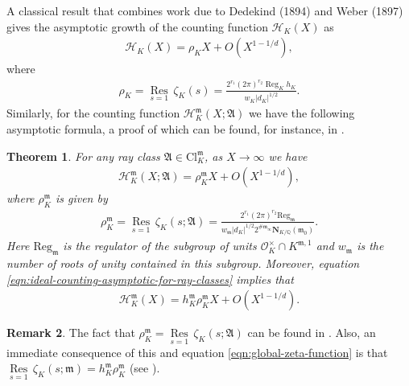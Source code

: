 \documentclass[11pt, reqno]{amsart}
\numberwithin{equation}{section}
\newtheorem{theorem}{Theorem}[section]
\newcommand{\Q}{\mathbb{Q}}
\newcommand{\Nrm}[2]{\mathbf{N}_{#1}(#2)}
\theoremstyle{definition}
\newtheorem{remark}[theorem]{Remark}
\begin{document}
A classical result that combines work due to Dedekind (1894) and Weber (1897) gives the asymptotic growth of the counting function $\mathcal{H}_K(X)$ as
\begin{align}
\label{eqn:dedekind-weber}
\mathcal{H}_K(X) = \rho_K X + O(X^{1 - 1/d}),
\end{align}
where 
\begin{align*}
\rho_K = \underset{s=1}{\operatorname{Res}}\,\zeta_K(s)=\frac{2^{r_1}(2 \pi)^{r_2} \operatorname{Reg}_K h_K}{w_K\left|d_K\right|^{1 / 2}}.
\end{align*}
Similarly, for the counting function $\mathcal{H}_K^{\mathfrak{m}}(X; \mathfrak{A})$ we have the following asymptotic formula, a proof of which can be found, for instance, in \cite[Chap. VI, \S 3, Thm. 3]{Lan94}.

\begin{theorem}\label{thm:Lang-asymptotic-formula}
For any ray class $\mathfrak{A} \in \mathrm{Cl}_K^{\mathfrak{m}}$, as $X \to \infty$ we have
\begin{align}\label{eqn:ideal-counting-asymptotic-for-ray-classes}
\mathcal{H}_K^{\mathfrak{m}}(X; \mathfrak{A}) = \rho_{K}^{\mathfrak{m}} X + O(X^{1 - 1/d}),
\end{align}
where $\rho_{K}^{\mathfrak{m}}$ is given by 
\begin{align}
\label{eqn:residue}
\rho_{K}^{\mathfrak{m}} = \underset{s=1}{\operatorname{Res}} \, \zeta_K(s; \mathfrak{A}) = \frac{2^{r_1} (2\pi)^{r_2} \mathrm{Reg}_{\mathfrak{m}}}{w_{\mathfrak{m}} |d_K|^{1/2} 2^{\# \mathfrak{m}_{\infty}}\Nrm{K/\Q}{\mathfrak{m}_0}}.
\end{align}
Here $\mathrm{Reg}_{\mathfrak{m}}$ is the regulator of the subgroup of units $\mathcal{O}_K^{\times} \cap K^{\mathfrak{m}, 1}$ and $w_{\mathfrak{m}}$ is the number of roots of unity contained in this subgroup. Moreover, equation \eqref{eqn:ideal-counting-asymptotic-for-ray-classes} implies that
\begin{align}\label{eqn:ideal-counting-asymptotic-for-ideals-prime-to-m}
\mathcal{H}_K^{\mathfrak{m}}(X) = h_K^{\mathfrak{m}} \rho_{K}^{\mathfrak{m}} X + O(X^{1 - 1/d}).
\end{align}
\end{theorem}

\begin{remark}
The fact that $\rho_{K}^{\mathfrak{m}} = \underset{s=1}{\operatorname{Res}} \, \zeta_K(s; \mathfrak{A})$ can be found in \cite[Chap. VIII, \S 2, Thm. 5c]{Lan94}. Also, an immediate consequence of this and equation \eqref{eqn:global-zeta-function} is that $\underset{s=1}{\operatorname{Res}} \, \zeta_K(s; \mathfrak{m}) = h_K^{\mathfrak{m}} \rho_{K}^{\mathfrak{m}}$ (see \cite[Chap. VIII, \S 2, Corollary to Thm. 5c, p. 161]{Lan94}).
\end{remark}
\end{document}
